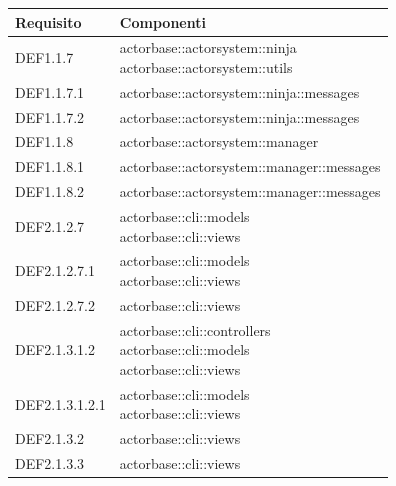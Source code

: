 \documentclass{scalatekids-article}
\begin{document}
\begin{longtable}[H]{|p{6cm}|p{11cm}|}
  \hline
  \textbf{Requisito} & \textbf{Componenti}\\
\hline
DEF1.1.7 & \multiLineCell[t]{actorbase::actorsystem::ninja\\actorbase::actorsystem::utils\\}\\
\hline
DEF1.1.7.1 & \multiLineCell[t]{actorbase::actorsystem::ninja::messages\\}\\
\hline
DEF1.1.7.2 & \multiLineCell[t]{actorbase::actorsystem::ninja::messages\\}\\
\hline
DEF1.1.8 & \multiLineCell[t]{actorbase::actorsystem::manager\\}\\
\hline
DEF1.1.8.1 & \multiLineCell[t]{actorbase::actorsystem::manager::messages\\}\\
\hline
DEF1.1.8.2 & \multiLineCell[t]{actorbase::actorsystem::manager::messages\\}\\
\hline
DEF2.1.2.7 & \multiLineCell[t]{actorbase::cli::models\\actorbase::cli::views\\}\\
\hline
DEF2.1.2.7.1 & \multiLineCell[t]{actorbase::cli::models\\actorbase::cli::views\\}\\
\hline
DEF2.1.2.7.2 & \multiLineCell[t]{actorbase::cli::views\\}\\
\hline
DEF2.1.3.1.2 & \multiLineCell[t]{actorbase::cli::controllers\\actorbase::cli::models\\actorbase::cli::views\\}\\
\hline
DEF2.1.3.1.2.1 & \multiLineCell[t]{actorbase::cli::models\\actorbase::cli::views\\}\\
\hline
DEF2.1.3.2 & \multiLineCell[t]{actorbase::cli::views\\}\\
\hline
DEF2.1.3.3 & \multiLineCell[t]{actorbase::cli::views\\}\\

\end{longtable}
\end{document}
